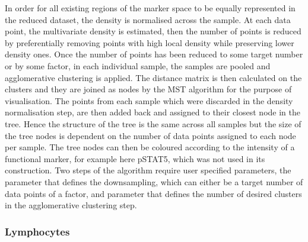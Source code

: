 In order for all existing regions of the marker space to be equally represented in the reduced dataset,
the density is normalised across the sample.
At each data point, the multivariate density is estimated, then the number of points is reduced by preferentially removing 
points with high local density while preserving lower density ones.
Once the number of points has been reduced to some target number or by some factor, in each individual sample,
the samples are pooled and agglomerative clustering is applied.
The distance matrix is then calculated on the clusters and they are joined as nodes by the \acrfull{MST} algorithm for the purpose of visualisation.
The points from each sample which were discarded in the density normalisation step, are then added back and assigned to their closest node in the tree.
Hence the structure of the tree is the same across all samples but the size of the tree nodes 
is dependent on the number of data points assigned to each node per sample.
The tree nodes can then be coloured according to the intensity of a functional marker, for example here pSTAT5,
which was not used in its construction.
Two steps of the algorithm require user specified parameters, the parameter that defines the downsampling,
which can either be a target number of data points of a factor, and parameter that defines the number of desired clusters
in the agglomerative clustering step.

\subsubsection{Lymphocytes}

